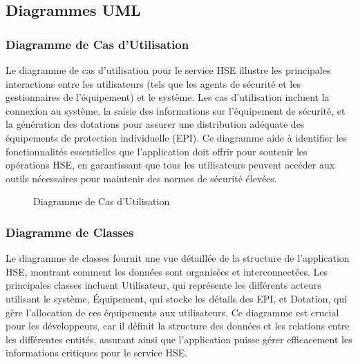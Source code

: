 \documentclass[a4paper,12pt]{report}
\begin{document}
\subsection{Diagrammes UML}

\subsubsection{Diagramme de Cas d'Utilisation}

Le diagramme de cas d'utilisation pour le service HSE illustre les principales interactions entre les utilisateurs (tels que les agents de sécurité et les gestionnaires de l'équipement) et le système. Les cas d'utilisation incluent la connexion au système, la saisie des informations sur l'équipement de sécurité, et la génération des dotations pour assurer une distribution adéquate des équipements de protection individuelle (EPI). Ce diagramme aide à identifier les fonctionnalités essentielles que l'application doit offrir pour soutenir les opérations HSE, en garantissant que tous les utilisateurs peuvent accéder aux outils nécessaires pour maintenir des normes de sécurité élevées.

\vspace{1cm}
\begin{figure}[H]
    \centering
    \caption{Diagramme de Cas d'Utilisation}
\end{figure}

\subsubsection{Diagramme de Classes}

Le diagramme de classes fournit une vue détaillée de la structure de l'application HSE, montrant comment les données sont organisées et interconnectées. Les principales classes incluent Utilisateur, qui représente les différents acteurs utilisant le système, Équipement, qui stocke les détails des EPI, et Dotation, qui gère l'allocation de ces équipements aux utilisateurs. Ce diagramme est crucial pour les développeurs, car il définit la structure des données et les relations entre les différentes entités, assurant ainsi que l'application puisse gérer efficacement les informations critiques pour le service HSE.
\end{document}
